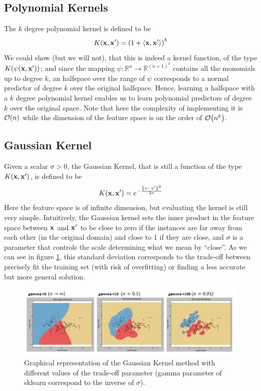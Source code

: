 \documentclass[12pt]{report}
\theoremstyle{plain}
\newcommand\sprod[2]{\langle \vb{#1},\vb{#2}\rangle}
\begin{document}
\begin{flushleft}
\subsection{Polynomial Kernels}
The $k$ degree polynomial kernel is defined to be
\[ K(\vb{x},\vb{x}')=\left(1+\sprod{x}{x'}\right)^k \]
We could show (but we will not), that this is indeed a kernel function, of the type $K(\psi(\vb{x},\vb{x}'))$; and since the mapping $\psi:\mathds{R}^n\to\mathds{R}^{(n+1)^k}$ contains all the monomials up to degree $k$, an halfspace over the range of $\psi$ corresponds to a normal predictor of degree $k$ over the original halfspace. Hence, learning a halfspace with a $k$ degree polynomial kernel enables us to learn polynomial predictors of degree $k$ over the original space. Note that here the complexity of implementing it is $\order{n}$ while the dimension of the feature space is on the order of $\order{n^k}$.

\subsection{Gaussian Kernel}
Given a scalar $\sigma>0$, the Gaussian Kernel, that is still a function of the type $K(\vb{x},\vb{x}')$, is defined to be
\[ K(\vb{x},\vb{x}')=e^{-\frac{\norm{x-x'}^2}{2\sigma}} \]
Here the feature space is of infinite dimension, but evaluating the kernel is still very simple. Intuitively, the Gaussian kernel sets the inner product in the feature space between $\vb{x}$ and $\vb{x}'$ to be close to zero if the instances are far away from each other (in
the original domain) and close to 1 if they are close, and $\sigma$ is a parameter that controls the scale determining what we mean by “close”. As we can see in figure \ref{fig:kernel_gauss_sigma}, this standard deviation corresponds to the trade-off between precisely fit the training set (with risk of overfitting) or finding a less accurate but more general solution.
\begin{figure}[!h]
	\centering
	\includegraphics[scale=0.6]{images/kernel_gauss_sigma.pdf}
	\caption{Graphical representation of the Gaussian Kernel method with different values of the trade-off parameter (gamma parameter of sklearn correspond to the inverse of $\sigma$).}
	\label{fig:kernel_gauss_sigma}
\end{figure}


\end{flushleft}
\end{document}
